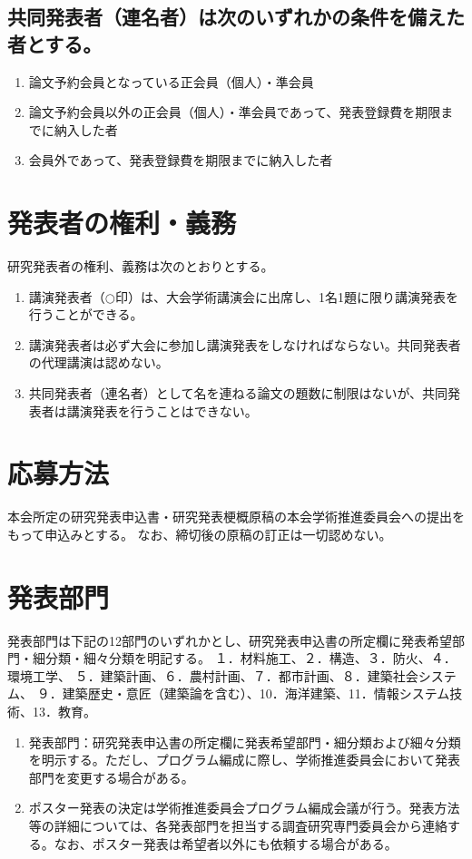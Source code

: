 \documentclass[base=10pt,magstyle=real,a4paper,twocolumn,xelatex,pandoc,jafont=ms]{bxjsarticle}
\begin{document}
	\subsection{共同発表者（連名者）は次のいずれかの条件を備えた者とする。}
		\begin{enumerate}
			\item 論文予約会員となっている正会員（個人）・準会員
			\item 論文予約会員以外の正会員（個人）・準会員であって、発表登録費を期限までに納入した者
			\item 会員外であって、発表登録費を期限までに納入した者
		\end{enumerate}
	
\section{発表者の権利・義務}
	研究発表者の権利、義務は次のとおりとする。
　		\begin{enumerate}
			\item 講演発表者（$\bigcirc$印）は、大会学術講演会に出席し、1名1題に限り講演発表を行うことができる。
			\item 講演発表者は必ず大会に参加し講演発表をしなければならない。共同発表者の代理講演は認めない。
			\item 共同発表者（連名者）として名を連ねる論文の題数に制限はないが、共同発表者は講演発表を行うことはできない。
		\end{enumerate}
			

\section{応募方法}
	本会所定の研究発表申込書・研究発表梗概原稿の本会学術推進委員会への提出をもって申込みとする。
	なお、締切後の原稿の訂正は一切認めない。
	
\section{発表部門}
	発表部門は下記の12部門のいずれかとし、研究発表申込書の所定欄に発表希望部門・細分類・細々分類を明記する。
	１．材料施工、２．構造、３．防火、４．環境工学、
	５．建築計画、６．農村計画、７．都市計画、８．建築社会システム、
	９．建築歴史・意匠（建築論を含む）、10．海洋建築、11．情報システム技術、13．教育。
	\begin{enumerate}
		\item 発表部門：研究発表申込書の所定欄に発表希望部門・細分類および細々分類を明示する。ただし、プログラム編成に際し、学術推進委員会において発表部門を変更する場合がある。
		\item ポスター発表の決定は学術推進委員会プログラム編成会議が行う。発表方法等の詳細については、各発表部門を担当する調査研究専門委員会から連絡する。なお、ポスター発表は希望者以外にも依頼する場合がある。
	\end{enumerate}
\end{document}
